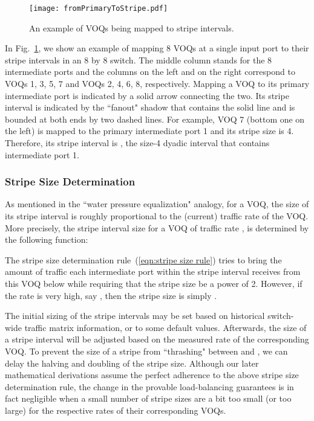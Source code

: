 \begin{figure}[htb]
  \centering
    \texttt{[image: fromPrimaryToStripe.pdf]}
    \caption{An example of VOQs being mapped to stripe intervals.}
\label{fig:stripe-interval-mapping}
\end{figure} 

In Fig.~\ref{fig:stripe-interval-mapping}, we show an example of mapping 8 VOQs at a single input port to their stripe intervals
in an 8 by 8 switch.  The middle column stands for the 8 intermediate ports and the columns
on the left and on the right correspond to VOQs 1, 3, 5, 7 and VOQs 2, 4, 6, 8, respectively.  Mapping a VOQ to 
its primary intermediate port is indicated by a solid arrow connecting the two.  Its stripe interval is indicated by 
the ``fanout" shadow that contains the solid line and is bounded at both ends by two dashed lines.  For example, 
VOQ 7 (bottom one on the left) is mapped to the primary intermediate 
port 1 and its stripe size is 4.  Therefore, its stripe interval is , the size-4 dyadic interval that contains intermediate
port 1.







\subsubsection{Stripe Size Determination}
\label{sec:stripe size eq}


As mentioned
in the ``water pressure equalization" analogy, for a VOQ, the size of its stripe interval is 
roughly proportional to the (current) traffic rate of the VOQ.  More precisely, the stripe interval size for
a VOQ of traffic rate , is determined by the following function:

The stripe size determination rule~(\ref{eqn:stripe size rule}) 
tries to bring the amount of traffic each intermediate port within the stripe interval receives from 
this VOQ below  while requiring that the stripe size 
be a power of 2. 
However, if the rate  is very high, say , then the stripe size  is simply .


The initial sizing of the  stripe intervals may be set based on historical switch-wide traffic matrix
information, or to some default values.  
Afterwards,
the size of a stripe interval will be adjusted based on the measured rate of the corresponding VOQ.  
To prevent the size of a stripe from ``thrashing" between  and , we can delay the 
halving and doubling of the stripe size.  Although our later mathematical derivations assume the perfect
adherence to the above stripe size determination rule, the change in the provable load-balancing guarantees
is in fact negligible when a small number of stripe sizes are a bit too small (or too large) for the respective rates of 
their corresponding VOQs.




